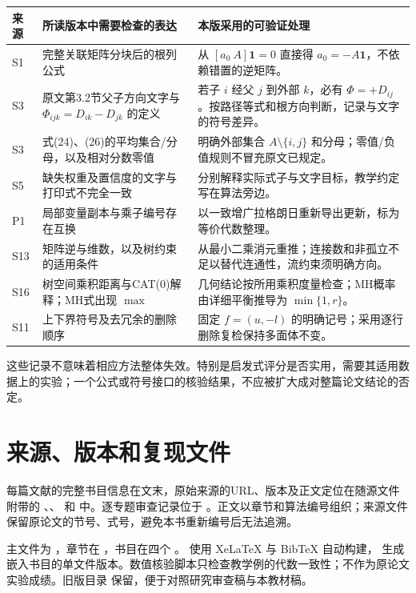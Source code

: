 \begin{longtable}{p{}p{}p{}}
\toprule 来源 & 所读版本中需要检查的表达 & 本版采用的可验证处理\\\midrule\endhead
S1 & 完整关联矩阵分块后的根列公式 & 从 $[a_0\ A]\mathbf1=0$ 直接得 $a_0=-A\mathbf1$，不依赖错置的逆矩阵。\\
S3 & 原文第3.2节父子方向文字与 $\Phi_{ijk}=D_{ik}-D_{jk}$ 的定义 & 若子 $i$ 经父 $j$ 到外部 $k$，必有 $\Phi=+D_{ij}$。按路径等式和根方向判断，记录与文字的符号差异。\\
S3 & 式(24)、(26)的平均集合/分母，以及相对分数零值 & 明确外部集合 $A\setminus\{i,j\}$ 和分母；零值/负值规则不冒充原文已规定。\\
S5 & 缺失权重及置信度的文字与打印式不完全一致 & 分别解释实际式子与文字目标，教学约定写在算法旁边。\\
P1 & 局部变量副本与乘子编号存在互换 & 以一致增广拉格朗日重新导出更新，标为等价代数整理。\\
S13 & 矩阵逆与维数，以及树约束的适用条件 & 从最小二乘消元重推；连接数和非孤立不足以替代连通性，流约束须明确方向。\\
S16 & 树空间乘积距离与CAT(0)解释；MH式出现 $\max$ & 几何结论按所用乘积度量检查；MH概率由详细平衡推导为 $\min\{1,r\}$。\\
S11 & 上下界符号及去冗余的删除顺序 & 固定 $f=(u,-l)$ 的明确记号；采用逐行删除复检保持多面体不变。\\
\bottomrule
\end{longtable}
这些记录不意味着相应方法整体失效。特别是启发式评分是否实用，需要其适用数据上的实验；一个公式或符号接口的核验结果，不应被扩大成对整篇论文结论的否定。

\section{来源、版本和复现文件}
每篇文献的完整书目信息在文末，原始来源的URL、版本及正文定位在随源文件附带的 、、 和  中。逐专题审查记录位于 。正文以章节和算法编号组织；来源文件保留原论文的节号、式号，避免本书重新编号后无法追溯。

主文件为 ，章节在 ，书目在四个 。 使用 XeLaTeX 与 BibTeX 自动构建， 生成嵌入书目的单文件版本。数值核验脚本只检查教学例的代数一致性；不作为原论文实验成绩。旧版目录  保留，便于对照研究审查稿与本教材稿。
